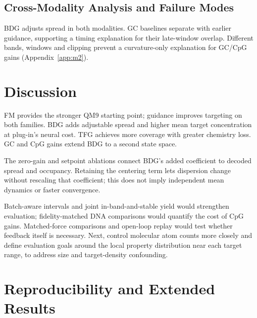 \documentclass{article}
\begin{document}
\subsection{Cross-Modality Analysis and Failure Modes}\label{sec:failure}
BDG adjusts spread in both modalities. GC baselines separate with earlier guidance, supporting a timing explanation for their late-window overlap. Different bands, windows and clipping prevent a curvature-only explanation for GC/CpG gains (Appendix~\ref{app:m2}).

\section{Discussion}
FM provides the stronger QM9 starting point; guidance improves targeting on both families. BDG adds adjustable spread and higher mean target concentration at plug-in's neural cost. TFG achieves more coverage with greater chemistry loss. GC and CpG gains extend BDG to a second state space.

The zero-gain and setpoint ablations connect BDG's added coefficient to decoded spread and occupancy. Retaining the centering term lets dispersion change without rescaling that coefficient; this does not imply independent mean dynamics or faster convergence.

Batch-aware intervals and joint in-band-and-stable yield would strengthen evaluation; fidelity-matched DNA comparisons would quantify the cost of CpG gains. Matched-force comparisons and open-loop replay would test whether feedback itself is necessary. Next, control molecular atom counts more closely and define evaluation goals around the local property distribution near each target range, to address size and target-density confounding.
\clearpage


\clearpage
\appendix
\renewcommand{\thetable}{S\arabic{table}}
\renewcommand{\theHtable}{S\arabic{table}}
\setcounter{table}{0}
\renewcommand{\thefigure}{S\arabic{figure}}
\renewcommand{\theHfigure}{S\arabic{figure}}
\setcounter{figure}{0}
\section{Reproducibility and Extended Results}
\end{document}
